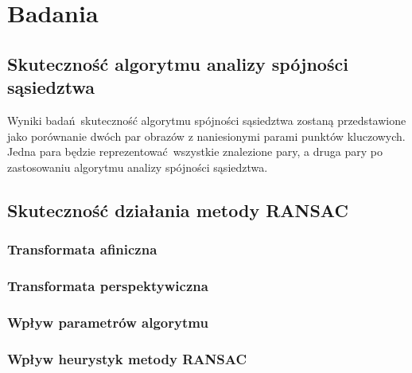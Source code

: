 \documentclass{article}
\begin{document}
	\section{Badania}
	\subsection{Skuteczność algorytmu analizy spójności sąsiedztwa}
	Wyniki badań skuteczność algorytmu spójności sąsiedztwa zostaną przedstawione jako porównanie dwóch par obrazów z naniesionymi parami punktów kluczowych. Jedna para będzie reprezentować wszystkie znalezione pary, a druga pary po zastosowaniu algorytmu analizy spójności sąsiedztwa.
	\subsection{Skuteczność działania metody RANSAC}
	\subsubsection{Transformata afiniczna}
	\subsubsection{Transformata perspektywiczna}
	\subsubsection{Wpływ parametrów algorytmu}
	\subsubsection{Wpływ heurystyk metody RANSAC}
	
	
\end{document}
